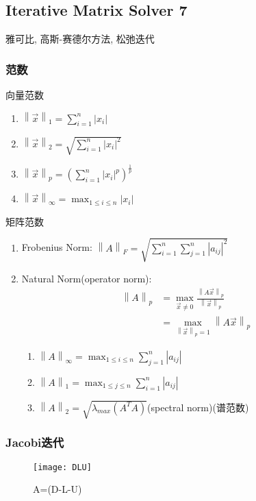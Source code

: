 \documentclass{source/Paper}
\begin{document}
    \subsection{Iterative Matrix Solver 7}
    雅可比, 高斯-赛德尔方法, 松弛迭代
    \subsubsection{范数}
    向量范数
    \begin{enumerate}
        \item $\left\| \vec{x} \right\|_1=\sum_{i=1}^{n}\left| x_i\right|$
        \item $\left\| \vec{x} \right\|_2=\sqrt{\sum_{i=1}^{n}\left| x_i\right|^2}$
        \item $\left\| \vec{x} \right\|_p=(\sum_{i=1}^{n}\left| x_i\right|^p)^{\frac{1}{p}}$
        \item $\left\| \vec{x} \right\|_{\infty}=\max_{1\le i\le n}\left| x_i\right|$
    \end{enumerate}

    矩阵范数
    \begin{enumerate}
        \item Frobenius Norm: $\left\| A \right\|_F=\sqrt{\sum_{i=1}^n\sum_{j=1}^n\left|a_{ij}\right|^2}$
        \item Natural Norm(operator norm): 
        \begin{align*}
            \left\| A \right\|_p&=\max_{\vec{x}\ne0}\frac{\left\| A\vec{x} \right\|_p}{\left\| \vec{x} \right\|_p}\\
            &=\max_{\left\| \vec{x} \right\|_p=1}\left\| A\vec{x} \right\|_p
        \end{align*}
        \begin{enumerate}
            \item $\left\| A \right\|_{\infty}=\max_{1\le i\le n}\sum_{j=1}^n\left| a_{ij} \right|$
            \item $\left\| A \right\|_{1}=\max_{1\le j\le n}\sum_{i=1}^n\left| a_{ij} \right|$
            \item $\left\| A \right\|_{2}=\sqrt{\lambda_{max}(A^T A)}$(spectral norm)(谱范数)
        \end{enumerate}

    \end{enumerate}

    \subsubsection{Jacobi迭代}
    \begin{figure}[H]
        \centering
        \texttt{[image: DLU]}
        \caption{A=(D-L-U)}
    \end{figure}
    
\end{document}
